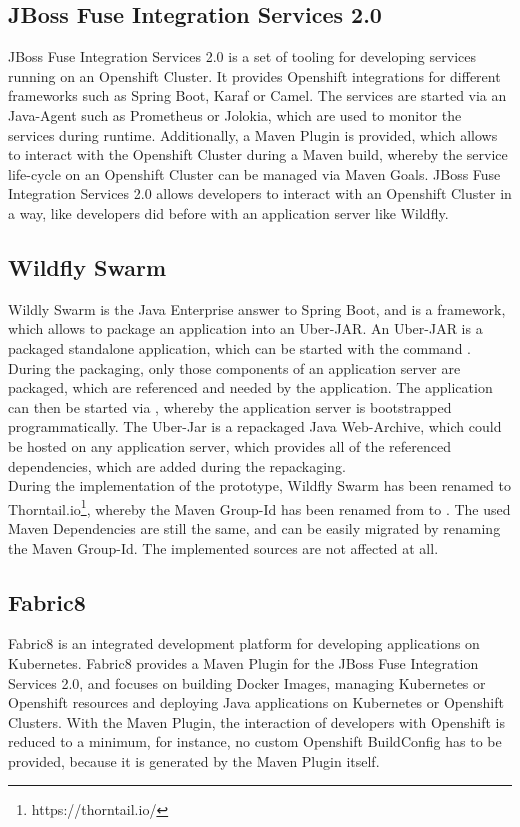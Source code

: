 \subsection{JBoss Fuse Integration Services 2.0}
\label{sec:esbi-technology-fis}
JBoss Fuse Integration Services 2.0 is a set of tooling for developing services running on an Openshift Cluster. It provides Openshift integrations for different frameworks such as Spring Boot, Karaf or Camel. The services are started via an Java-Agent such as Prometheus or Jolokia, which are used to monitor the services during runtime. Additionally, a Maven Plugin is provided, which allows to interact with the Openshift Cluster during a Maven build, whereby the service life-cycle on an Openshift Cluster can be managed via Maven Goals. JBoss Fuse Integration Services 2.0 allows developers to interact with an Openshift Cluster in a way, like developers did before with an application server like Wildfly\cite{Prometheus2018, Jolokia2018}.

\subsection{Wildfly Swarm}
\label{sec:esbi-technology-swarm}
Wildly Swarm is the Java Enterprise answer to Spring Boot, and is a framework, which allows to package an application into an Uber-JAR. An Uber-JAR is a packaged standalone application, which can be started with the command . During the packaging, only those components of an application server are packaged, which are referenced and needed by the application. The application can then be started via , whereby the application server is bootstrapped programmatically. The Uber-Jar is a repackaged Java Web-Archive, which could be hosted on any application server, which provides all of the referenced dependencies, which are added during the repackaging\cite{WildflySwarm2018}.  \\

During the implementation of the prototype, Wildfly Swarm has been renamed to Thorntail.io\footnote{https://thorntail.io/}, whereby the Maven Group-Id has been renamed from  to . The used Maven Dependencies are still the same, and can be easily migrated by renaming the Maven Group-Id. The implemented sources are not affected at all.

\subsection{Fabric8}
\label{sec:esbi-technology-f8}
Fabric8 is an integrated development platform for developing applications on Kubernetes. Fabric8 provides a  Maven Plugin for the JBoss Fuse Integration Services 2.0, and focuses on building Docker Images, managing Kubernetes or Openshift resources and deploying Java applications on Kubernetes or Openshift Clusters. With the Maven Plugin, the interaction of developers with Openshift is reduced to a minimum, for instance, no custom Openshift BuildConfig has to be provided, because it is generated by the Maven Plugin itself\cite{Fabric82018}. \\

